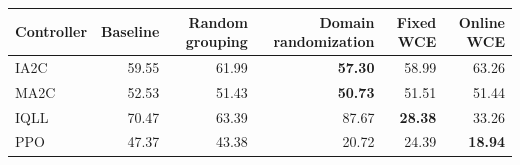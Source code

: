 \begin{tabular}{lrrrrr}
\hline
Controller & Baseline & Random grouping & Domain randomization & Fixed WCE & Online WCE \\
\hline
IA2C & 59.55 & 61.99 & \textbf{57.30} & 58.99 & 63.26 \\
MA2C & 52.53 & 51.43 & \textbf{50.73} & 51.51 & 51.44 \\
IQLL & 70.47 & 63.39 & 87.67 & \textbf{28.38} & 33.26 \\
PPO & 47.37 & 43.38 & 20.72 & 24.39 & \textbf{18.94} \\
\hline
\end{tabular}
